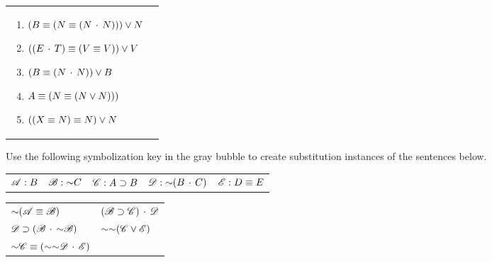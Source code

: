 \begin{exercises}
\begin{longtabu}{p{2.5in}p{2.5in}}
\begin{flushleft}
\begin{enumerate}[label=\alph*.]
\item 	$(B \equiv (N \equiv (N \,\cdot\, N))) \vee N  			$ %
\item 	$((E \,\cdot\, T) \equiv (V \equiv V )) \vee V  			$  %
\item 	$ (B \equiv (N \,\cdot\, N)) \vee B			$  %
\item 	$A \equiv (N \equiv (N \vee N)))			$ %
\item 	$((X \equiv N) \equiv N) \vee N			$ %
\end{enumerate}
\end{flushleft}
\end{longtabu}
\end{exercises}

\noindent\problempart Use the following symbolization key in the gray bubble to create substitution instances of the sentences below.

\begin{mdframed}[style=mytablebox] 
\begin{longtabu}{X[.5]X[.5]X[1]X[1]X[1]} 
$\mathscr{A}: B$ 	& 	$\mathscr{B}: \mathord{\sim} C$  	& $\mathscr{C}: A \supset B$ &
$\mathscr{D}:\mathord{\sim} (B \,\cdot\, C)$  & $\mathscr{E}: D \equiv E$
\end{longtabu}
\end{mdframed}

\begin{exercises}
\begin{longtabu}{X[1,l,m]X[1,p,m]} 
\item $\mathord{\sim}( \mathscr{A} \equiv \mathscr{B})$ 
&

\item $(\mathscr{B} \supset \mathscr{C}) \,\cdot\, \mathscr{D}$ 


\\
\item $\mathscr{D} \supset (\mathscr{B} \,\cdot\, \mathord{\sim} \mathscr{B}) $ 


&
\item $\mathord{\sim} \mathord{\sim} (\mathscr{C} \vee \mathscr{E})$ 


\\
\item $\mathord{\sim} \mathscr{C} \equiv (\mathord{\sim} \mathord{\sim} \mathscr{D} \,\cdot\, \mathscr{E})$ 



\end{longtabu}
\end{exercises}



